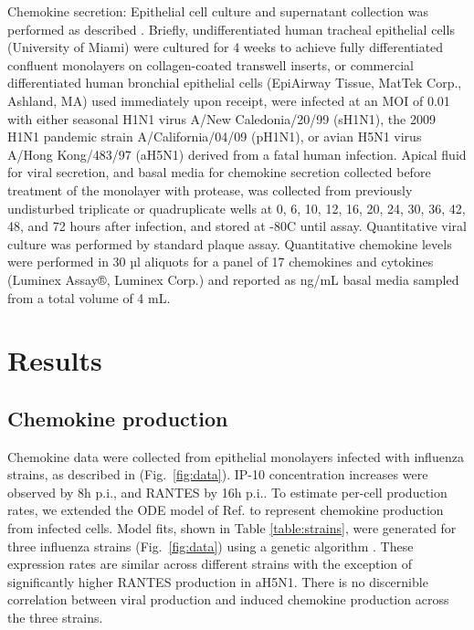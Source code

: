 \documentclass[10pt]{article}
\begin{document}
Chemokine secretion:  Epithelial cell culture and supernatant collection was performed as described \cite{Mitchell2011}.  Briefly, undifferentiated human tracheal epithelial cells (University of Miami) were cultured for 4 weeks to achieve fully differentiated confluent monolayers on collagen-coated transwell inserts, or commercial differentiated human bronchial epithelial cells (EpiAirway Tissue, MatTek Corp., Ashland, MA) used immediately upon receipt, were infected at an MOI of 0.01 with either seasonal H1N1 virus A/New Caledonia/20/99 (sH1N1), the 2009 H1N1 pandemic strain A/California/04/09 (pH1N1), or avian H5N1 virus A/Hong Kong/483/97 (aH5N1) derived from a fatal human infection.  Apical fluid for viral secretion, and basal media for chemokine secretion collected before treatment of the monolayer with protease, was collected from previously undisturbed triplicate or quadruplicate wells at 0, 6, 10, 12, 16, 20, 24, 30, 36, 42, 48, and 72 hours after infection, and stored at -80C until assay.  Quantitative viral culture was performed by standard plaque assay.  Quantitative chemokine levels were performed in 30 µl aliquots for a panel of 17 chemokines and cytokines (Luminex Assay®, Luminex Corp.) and reported as ng/mL basal media sampled from a total volume of 4 mL.

\section*{Results}

\subsection*{Chemokine production}

Chemokine data were collected from epithelial monolayers infected with influenza strains, as described in \cite{Mitchell2011} (Fig.~\ref{fig:data}).  IP-10 concentration increases were observed by 8h p.i., and RANTES by 16h p.i..  To estimate per-cell production rates, we extended the ODE model of Ref. \cite{Mitchell2011} to represent chemokine production from infected cells.  Model fits, shown in Table \ref{table:strains}, were generated for three influenza strains (Fig.~\ref{fig:data}) using a genetic algorithm \cite{Mitchell2011}.  These expression rates are similar across different strains with the exception of significantly higher RANTES production in aH5N1.  There is no discernible correlation between viral production and induced chemokine production across the three strains.
\end{document}
